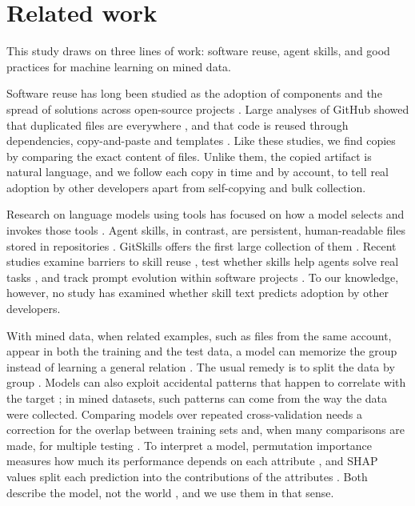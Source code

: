 \section{Related work}\label{related-work}

This study draws on three lines of work: software reuse, agent skills,
and good practices for machine learning on mined data.

Software reuse has long been studied as the adoption of components and
the spread of solutions across open-source projects
\cite{mockus2002two,haefliger2008code}. Large analyses of GitHub showed
that duplicated files are everywhere \cite{lopes2017dejavu}, and that
code is reused through dependencies, copy-and-paste and templates
\cite{heinemann2011extents}. Like these studies, we find copies by
comparing the exact content of files. Unlike them, the copied artifact
is natural language, and we follow each copy in time and by account, to
tell real adoption by other developers apart from self-copying and bulk
collection.

Research on language models using tools has focused on how a model
selects and invokes those tools
\cite{schick2023toolformer,shen2023hugginggpt,yao2023react,qin2023toolllm}.
Agent skills, in contrast, are persistent, human-readable files stored
in repositories \cite{agentskills_spec}. GitSkills offers the first
large collection of them \cite{gitskills2027}. Recent studies examine
barriers to skill reuse \cite{zhang2026keepskillsreuse}, test whether
skills help agents solve real tasks \cite{han2026sweskillsbench}, and
track prompt evolution within software projects
\cite{tafreshipour2025prompting}. To our knowledge, however, no study
has examined whether skill text predicts adoption by other developers.

With mined data, when related examples, such as files from the same
account, appear in both the training and the test data, a model can
memorize the group instead of learning a general relation
\cite{kaufman2012leakage}. The usual remedy is to split the data by
group \cite{saeb2017need,roberts2017cross}. Models can also exploit
accidental patterns that happen to correlate with the target
\cite{geirhos2020shortcut,lapuschkin2019unmasking}; in mined datasets,
such patterns can come from the way the data were collected. Comparing
models over repeated cross-validation needs a correction for the overlap
between training sets \cite{nadeau2003inference} and, when many
comparisons are made, for multiple testing \cite{holm1979simple}. To
interpret a model, permutation importance measures how much its
performance depends on each attribute
\cite{breiman2001statistical,molnar2020interpretable}, and SHAP values
split each prediction into the contributions of the attributes
\cite{lundberg2017unified,lundberg2020local}. Both describe the model,
not the world \cite{shmueli2010explain}, and we use them in that sense.
